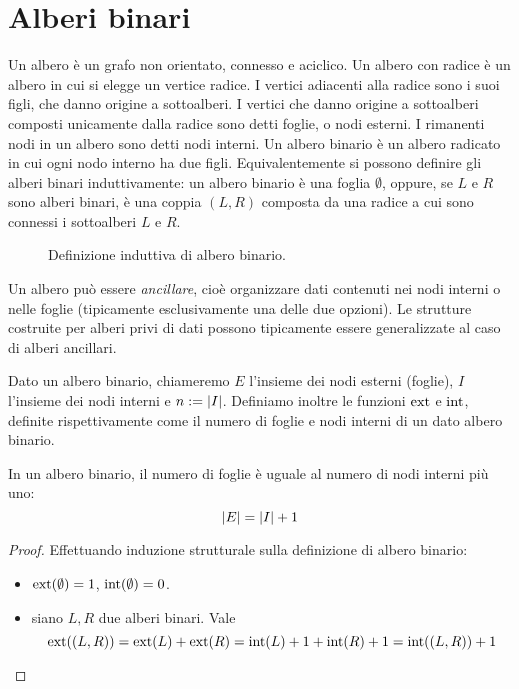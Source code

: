 \section{Alberi binari}
Un albero è un grafo non orientato, connesso e aciclico.
Un albero con radice è un albero in cui si elegge un vertice radice. I vertici adiacenti alla radice sono i suoi figli, che danno origine a sottoalberi. I vertici che danno origine a sottoalberi composti unicamente dalla radice sono detti foglie, o nodi esterni. I rimanenti nodi in un albero sono detti nodi interni.
Un albero binario è un albero radicato in cui ogni nodo interno ha due figli.
Equivalentemente si possono definire gli alberi binari induttivamente: un albero binario è una foglia $\emptyset$, oppure, se $L$ e $R$ sono alberi binari, è una coppia $(L,R)$ composta da una radice a cui sono connessi i sottoalberi $L$ e $R$.

\begin{figure}
	
	\caption{Definizione induttiva di albero binario.}
	\label{fig:btree_inductive}
\end{figure}

Un albero può essere \emph{ancillare}, cioè organizzare dati contenuti nei nodi interni o nelle foglie (tipicamente esclusivamente una delle due opzioni). Le strutture costruite per alberi privi di dati possono tipicamente essere generalizzate al caso di alberi ancillari.

Dato un albero binario, chiameremo $E$ l'insieme dei nodi esterni (foglie), $I$ l'insieme dei nodi interni e $n:=| I |$.
Definiamo inoltre le funzioni $\mathrm{ext}$ e $\mathrm{int}$, definite rispettivamente come il numero di foglie e nodi interni di un dato albero binario.

\begin{theorem}\label{thm:btree_leaves}
	In un albero binario, il numero di foglie è uguale al numero di nodi interni più uno:
	\begin{equation*}
		| E | = | I | + 1
	\end{equation*}
\end{theorem}
\begin{proof}
	Effettuando induzione strutturale sulla definizione di albero binario:
	\begin{itemize}
		\item $\mathrm{ext}(\emptyset)=1$, $\mathrm{int}(\emptyset)=0$.
		\item siano $L, R$ due alberi binari. Vale
		      \begin{equation*}
			      \mathrm{ext}((L,R)) = \mathrm{ext}(L) + \mathrm{ext}(R) = \mathrm{int}(L) + 1 + \mathrm{int}(R) + 1 = \mathrm{int}((L, R))  + 1
		      \end{equation*}
	\end{itemize}
\end{proof}

